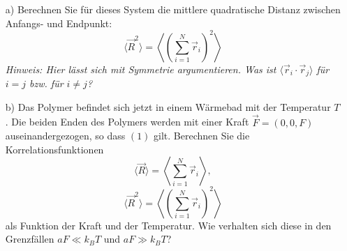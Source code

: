 \documentclass[prb,12pt]{revtex4-2}
\theoremstyle{definition}
\theoremstyle{definition}
\begin{document}
\begin{enumerate}
	\item[a)] Berechnen Sie für dieses System die mittlere quadratische Distanz zwischen Anfangs- und Endpunkt:
	\[
	\langle \vec{R}^2 \rangle = \left\langle \left( \sum_{i=1}^N \vec{r}_i \right)^2 \right\rangle
	\]
	\textit{Hinweis: Hier lässt sich mit Symmetrie argumentieren. Was ist \( \langle \vec{r}_i \cdot \vec{r}_j \rangle \) für \( i = j \) bzw. für \( i \neq j \)?}
	
	\item[b)] Das Polymer befindet sich jetzt in einem Wärmebad mit der Temperatur \( T \). Die beiden Enden des Polymers werden mit einer Kraft \( \vec{F} = (0, 0, F) \) auseinandergezogen, so dass \((1)\) gilt. Berechnen Sie die Korrelationsfunktionen
	\[
	\langle \vec{R} \rangle = \left\langle \sum_{i=1}^N \vec{r}_i \right\rangle,
	\]
	\[
	\langle \vec{R}^2 \rangle = \left\langle \left( \sum_{i=1}^N \vec{r}_i \right)^2 \right\rangle
	\]
	als Funktion der Kraft und der Temperatur. Wie verhalten sich diese in den Grenzfällen \( aF \ll k_B T \) und \( aF \gg k_B T \)?
\end{enumerate}
\end{document}
